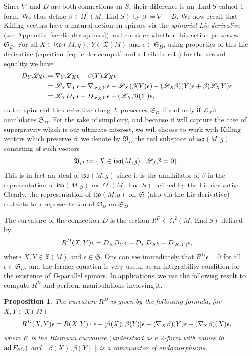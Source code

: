 \documentclass[11pt]{article}
\numberwithin{equation}{section}
\numberwithin{equation}{section}
\newtheorem{Proposition}[Theorem]{Proposition}
 { \theoremstyle{definition}
\newtheorem{Definition}[Theorem]{Definition}
\newtheorem{Note}[Theorem]{Note}
\newtheorem{Example}[Theorem]{Example}
\newtheorem{Remark}[Theorem]{Remark} }
\newcommand{\fiso}{\mathfrak{iso}}
\newcommand{\fX}{\mathfrak{X}}
\newcommand{\fS}{\mathfrak{S}}
\newcommand{\fV}{\mathfrak{V}}
\newcommand{\eL}{\mathscr{L}}
\newcommand{\Sbundle}{\underline{S}}
\newcommand{\1}{\mathbbm{1}}
\DeclareMathOperator{\End}{End}
\DeclareMathOperator{\ad}{ad}
\begin{document}
Since $\nabla$ and $D$ are both connections on $\Sbundle$, their difference is an $\End\Sbundle$-valued 1-form. We thus define $\beta\in\Omega^1(M;\End\Sbundle)$ by $\beta := \nabla - D$. We now recall that Killing vectors have a natural action on spinors via the \emph{spinorial Lie derivative} (see Appendix~\ref{sec:lie-der-spinors}) and consider whether this action preserves $\fS_D$. For all $X\in\fiso(M,g)$, $Y\in\fX(M)$ and $\epsilon\in\fS_D$, using properties of this Lie derivative (equation~\eqref{eq:lie-der-compat} and a Leibniz rule) for the second equality we have
\begin{align*}
	D_Y\eL_X \epsilon
	&= \nabla_Y\eL_X\epsilon -\beta(Y)\eL_X\epsilon\\
&= \eL_X\nabla_Y\epsilon -\nabla_{\eL_X Y}\epsilon -\eL_X\qty(\beta(Y)\epsilon) +\qty(\eL_X\beta)(Y)\epsilon +\beta(\eL_XY)\epsilon\\
	&= \eL_X D_Y\epsilon - D_{\eL_X Y}\epsilon +\qty(\eL_X\beta)(Y)\epsilon,
\end{align*}
so the spinorial Lie derivative along $X$ preserves $\fS_D$ if and only if $\eL_X\beta$ annihilates $\fS_D$. For the sake of simplicity, and because it will capture the case of supergravity which is our ultimate interest, we will choose to work with Killing vectors which preserve $\beta$; we denote by $\fV_D$ the real subspace of $\fiso(M,g)$ consisting of such vectors
\[
\fV_D := \qty{X\in\fiso(M,g)\mid \eL_X \beta = 0}.
\]
This is in fact an ideal of $\fiso(M,g)$ since it is the annihilator of $\beta$ in the representation of $\fiso(M,g)$ on~$\Omega^1(M;\End\Sbundle)$ defined by the Lie derivative. Clearly, the representation of $\fiso(M,g)$ on~$\fS$ (also via the Lie derivative) restricts to a representation of $\fV_D$ on $\fS_D$.

The curvature of the connection $D$ is the section $R^D \in \Omega^2(M;\End\Sbundle)$ defined by
\begin{gather}\label{eq:D-curvature-def}
	R^D(X,Y)\epsilon = D_XD_Y\epsilon - D_YD_X\epsilon - D_{\comm{X}{Y}}\epsilon,
\end{gather}
where $X,Y\in\fX(M)$ and $\epsilon\in\fS$. One can see immediately that $R^D\epsilon=0$ for all $\epsilon\in\fS_D$, and the former equation is very useful as an integrability condition for the existence of $D$-parallel spinors. In applications, we use the following result to compute $R^D$ and perform manipulations involving it.

\begin{Proposition}\label{prop:D-curvature}
	The curvature $R^D$ is given by the following formula, for $X,Y\in\fX(M)$
	\begin{equation}\label{eq:D-curvature-formula}
		R^D(X,Y)\epsilon = R(X,Y)\cdot\epsilon + \comm{\beta(X)}{\beta(Y)}\epsilon - (\nabla_X\beta)(Y)\epsilon - (\nabla_Y\beta)(X)\epsilon,
	\end{equation}
	where $R$ is the Riemann curvature $($understood as a $2$-form with values in $\ad F_{\rm SO})$ and $[\beta(X),\allowbreak\beta(Y)]$ is a commutator of endomorphisms.
\end{Proposition}
\end{document}
